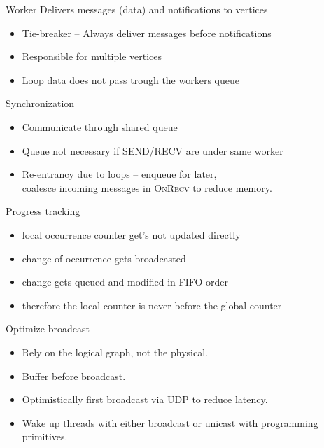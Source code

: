 \begin{frame}[t]{Worker}
  \vspace{0.15cm}
  Delivers messages (data) and notifications to vertices

  \begin{itemize}\setlength\itemsep{0.25cm}
    \item Tie-breaker -- Always deliver messages before notifications
    \item Responsible for multiple vertices
    \item Loop data does not pass trough the workers queue
  \end{itemize}

  \pause
  \vspace{0.25cm}
  Synchronization
  \begin{itemize}\setlength\itemsep{0.25cm}
    \item Communicate through shared queue
    \item Queue not necessary if \textsc{SEND/RECV} are under same worker
    \item Re-entrancy due to loops -- enqueue for later, \\
          coalesce incoming messages in \textsc{OnRecv} to reduce memory.
  \end{itemize}

\end{frame}

\begin{frame}[t]{Progress tracking}
\vspace{0.15cm}
  \begin{itemize}\setlength\itemsep{0.25cm}
     \item local occurrence counter get's not updated directly
     \item change of occurrence gets broadcasted
    \item change gets queued and modified in FIFO order
    \item therefore the local counter is never before the global counter
   \end{itemize}

\pause

  \vspace{0.15cm}
  Optimize broadcast
   \begin{itemize}\setlength\itemsep{0.25cm}
     \item Rely on the logical graph, not the physical.
     \item Buffer before broadcast.
     \item Optimistically first broadcast via UDP to reduce latency.
     \item Wake up threads with either broadcast or unicast with programming primitives.
   \end{itemize}

\end{frame}

